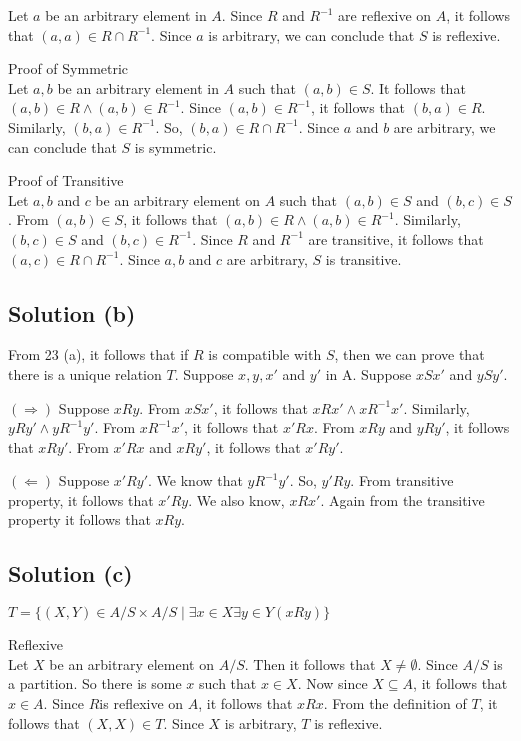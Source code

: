 \documentclass{article}
\begin{document}
Let $a$ be an arbitrary element in $A$. Since $R$ and $R^{-1}$ are
reflexive on $A$, it follows that $(a,a) \in R \cap R^{-1}$. Since $a$
is arbitrary, we can conclude that $S$ is reflexive.

Proof of Symmetric \\

Let $a,b$ be an arbitrary element in $A$ such that $(a,b) \in S$. It
follows that $(a,b) \in R \land (a,b) \in R^{-1}$. Since $(a,b) \in
R^{-1}$, it follows that $(b,a) \in R$. Similarly, $(b,a) \in R^{-1}$.
So, $(b,a) \in R \cap R^{-1}$. Since $a$ and $b$ are arbitrary, we can
conclude that $S$ is symmetric.

Proof of Transitive \\

Let $a,b$ and $c$ be an arbitrary element on $A$ such that $(a,b) \in
S$ and $(b,c) \in S$. From $(a,b) \in S$, it follows that $(a,b) \in R
\land (a,b) \in R^{-1}$. Similarly, $(b,c) \in S$ and $(b,c) \in
R^{-1}$. Since $R$ and $R^{-1}$ are transitive, it follows that $(a,c)
\in R \cap R^{-1}$. Since $a,b$ and $c$ are arbitrary, $S$ is
transitive.

\subsection{Solution (b)}
From 23 (a), it follows that if $R$ is compatible with $S$, then we
can prove that there is a unique relation $T$. Suppose $x,y,x'$ and
$y'$ in A. Suppose $xSx'$ and $ySy'$.

$(\Rightarrow)$ Suppose $xRy$. From $xSx'$, it follows that $xRx'
\land xR^{-1}x'$. Similarly, $yRy' \land yR^{-1}y'$. From $xR^{-1}x'$,
it follows that $x'Rx$. From $xRy$ and $yRy'$, it follows that $xRy'$.
From $x'Rx$ and $xRy'$, it follows that $x'Ry'$.

$(\Leftarrow)$ Suppose $x'Ry'$. We know that $yR^{-1}y'$. So, $y'Ry$.
From transitive property, it follows that $x'Ry$. We also know,
$xRx'$. Again from the transitive property it follows that $xRy$.

\subsection{Solution (c)}

$T = \{(X,Y) \in A/S \times A/S \mid \exists x \in X \exists y \in Y (xRy)\}$

Reflexive \\
Let $X$ be an arbitrary element on $A/S$. Then it follows that $X \neq
\emptyset$. Since $A/S$ is a partition. So there is some $x$ such that
$x \in X$. Now since $X \subseteq A$, it follows that $x \in A$. Since
$R$is reflexive on $A$, it follows that $xRx$. From the definition of
$T$, it follows that $(X,X) \in T$. Since $X$ is arbitrary, $T$ is
reflexive.
\end{document}

